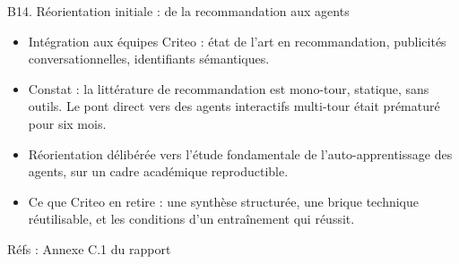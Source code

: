 \documentclass[aspectratio=169,10pt]{beamer}
\newcommand{\refs}[1]{\vfill{\tiny\textcolor{crMid}{Réfs : #1}}}
\begin{document}
\begin{frame}{B14. Réorientation initiale : de la recommandation aux agents}
\begin{itemize}
  \item Intégration aux équipes Criteo : état de l'art en recommandation, publicités conversationnelles, identifiants sémantiques.
  \item Constat : la littérature de recommandation est mono-tour, statique, sans outils. Le pont direct vers des agents interactifs multi-tour était prématuré pour six mois.
  \item Réorientation délibérée vers l'étude fondamentale de l'auto-apprentissage des agents, sur un cadre académique reproductible.
  \item Ce que Criteo en retire : une synthèse structurée, une brique technique réutilisable, et les conditions d'un entraînement qui réussit.
\end{itemize}
\refs{Annexe C.1 du rapport}
\end{frame}
\end{document}
